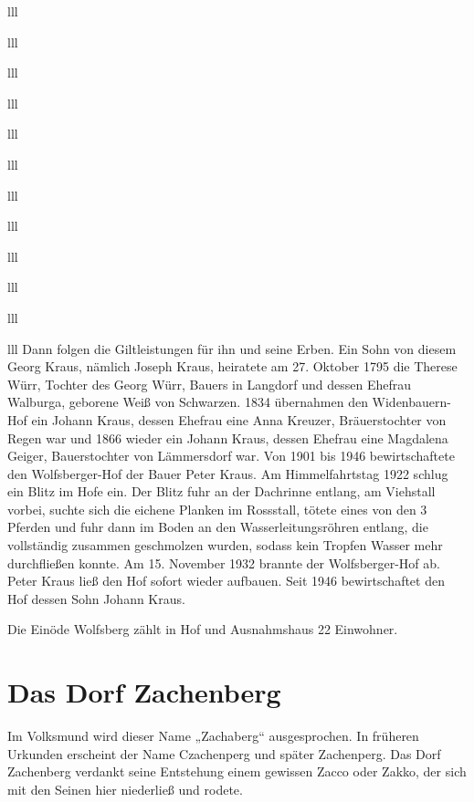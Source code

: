 \documentclass[12pt,a4pager]{book}
\begin{document}
\begin{tabuluar}{lll}
\begin{tabuluar}{lll}
\begin{tabuluar}{lll}
\begin{tabuluar}{lll}
\begin{tabuluar}{lll}
\begin{tabuluar}{lll}
\begin{tabuluar}{lll}
\begin{tabuluar}{lll}
\begin{tabuluar}{lll}
\begin{tabuluar}{lll}
\begin{tabuluar}{lll}
\begin{tabuluar}{lll}
Dann folgen die Giltleistungen für ihn und seine Erben. Ein Sohn von diesem
Georg Kraus, nämlich Joseph Kraus, heiratete am 27. Oktober 1795 die Therese
Würr, Tochter des Georg Würr, Bauers in Langdorf und dessen Ehefrau Walburga,
geborene Weiß von Schwarzen. 1834 übernahmen den Widenbauern-Hof ein Johann
Kraus, dessen Ehefrau eine Anna Kreuzer, Bräuerstochter von Regen war und 1866
wieder ein Johann Kraus, dessen Ehefrau eine Magdalena Geiger, Bauerstochter von
Lämmersdorf war. Von 1901 bis 1946 bewirtschaftete den Wolfsberger-Hof der Bauer
Peter Kraus. Am Himmelfahrtstag 1922 schlug ein Blitz im Hofe ein. Der Blitz
fuhr an der Dachrinne entlang, am Viehstall vorbei, suchte sich die eichene
Planken im Rossstall, tötete eines von den 3 Pferden und fuhr dann im Boden an
den Wasserleitungsröhren entlang, die vollständig zusammen geschmolzen wurden,
sodass kein Tropfen Wasser mehr durchfließen konnte. Am 15. November 1932
brannte der Wolfsberger-Hof ab. Peter Kraus ließ den Hof sofort wieder aufbauen.
Seit 1946 bewirtschaftet den Hof dessen Sohn Johann Kraus.

Die Einöde Wolfsberg zählt in Hof und Ausnahmshaus 22 Einwohner.

\section{Das Dorf Zachenberg}

Im Volksmund wird dieser Name „Zachaberg“ ausgesprochen. In früheren Urkunden
erscheint der Name Czachenperg und später Zachenperg. Das Dorf Zachenberg
verdankt seine Entstehung einem gewissen Zacco oder Zakko, der sich mit den
Seinen hier niederließ und rodete.


\end{tabuluar}
\end{tabuluar}
\end{tabuluar}
\end{tabuluar}
\end{tabuluar}
\end{tabuluar}
\end{tabuluar}
\end{tabuluar}
\end{tabuluar}
\end{tabuluar}
\end{tabuluar}
\end{tabuluar}
\end{document}
